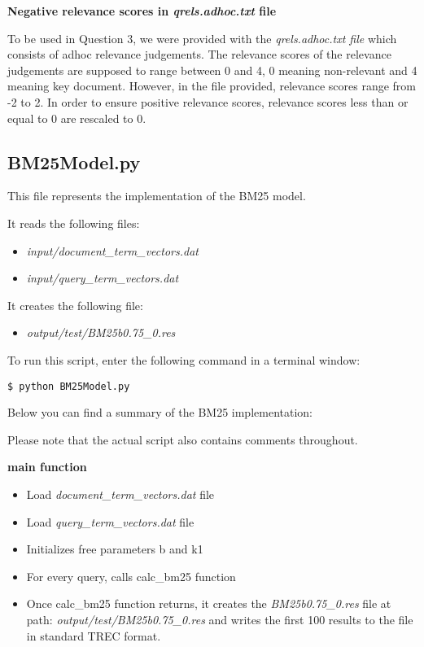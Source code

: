 \documentclass{article} %
\begin{document}
\textbf{Negative relevance scores in \textit{qrels.adhoc.txt} file}

To be used in Question 3, we were provided with the \textit{qrels.adhoc.txt file} which consists of adhoc relevance judgements. The relevance scores of the relevance judgements are supposed to range between 0 and 4, 0 meaning non-relevant and 4 meaning key document. However, in the file provided, relevance scores range from -2 to 2. In order to ensure positive relevance scores, relevance scores less than or equal to 0 are rescaled to 0.

\subsection*{BM25Model.py \cite{okapibm25}}

This file represents the implementation of the BM25 model.

It reads the following files:

\begin{itemize}
    \item \textit{input/document\_term\_vectors.dat}
    \item \textit{input/query\_term\_vectors.dat}
\end{itemize}

It creates the following file:

\begin{itemize}
    \item \textit{output/test/BM25b0.75\_0.res}
\end{itemize}

To run this script, enter the following command in a terminal window:

\begin{lstlisting}[style=Bash]
  $ python BM25Model.py
\end{lstlisting}

Below you can find a summary of the BM25 implementation:

Please note that the actual script also contains comments throughout.

\textbf{main function}

\begin{itemize}
    \item Load \textit{document\_term\_vectors.dat} file
    \item Load \textit{query\_term\_vectors.dat} file
    \item Initializes free parameters b and k1
    \item For every query, calls calc\_bm25 function
    \item Once calc\_bm25 function returns, it creates the \textit{BM25b0.75\_0.res} file at path: \textit{output/test/BM25b0.75\_0.res} and writes the first 100 results to the file in standard TREC format.
\end{itemize}
\end{document}
